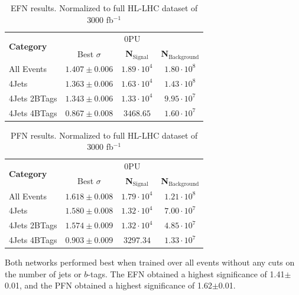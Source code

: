 \begin{table}[ht!]
\centering
    \begin{tabular}{|l|c|c|c|} %
      \hline\hline
      \multirow{2}{*}{\textbf{Category}} & \multicolumn{3}{c|}{0PU}\\
      \cline{2-4}
      & Best $\sigma$ & \textbf{N$_{\mathrm{Signal}}$} & \textbf{N$_{\mathrm{Background}}$} \\
      \hline
      All Events & $1.407 \pm 0.006$ & $1.89\cdot 10^4$ & $1.80\cdot 10^8$ \\
      4Jets & $1.363 \pm 0.006$ & $1.63\cdot 10^4$ & $1.43\cdot 10^8$ \\
      4Jets 2BTags & $1.343 \pm 0.006$ & $1.33\cdot 10^4$ & $9.95\cdot 10^7$ \\
      4Jets 4BTags & $0.867 \pm 0.008$ & $3468.65$ & $1.60\cdot 10^7$ \\
      \hline\hline
    \end{tabular}
    \caption{EFN results. Normalized to full HL-LHC dataset of 3000 fb$^{-1}$}
\label{EFNtab}
\end{table}

\begin{table}[ht!]
\centering
    \begin{tabular}{|l|c|c|c|} %
      \hline\hline
      \multirow{2}{*}{\textbf{Category}} & \multicolumn{3}{c|}{0PU}\\
      \cline{2-4}
      & Best $\sigma$ & \textbf{N$_{\mathrm{Signal}}$} & \textbf{N$_{\mathrm{Background}}$} \\
      \hline
      All Events & $1.618 \pm 0.008$ & $1.79\cdot 10^4$ & $1.21\cdot 10^8$ \\
      4Jets & $1.580 \pm 0.008$ & $1.32\cdot 10^4$ & $7.00\cdot 10^7$ \\
      4Jets 2BTags & $1.574 \pm 0.009$ & $1.32\cdot 10^4$ & $4.85\cdot 10^7$ \\
      4Jets 4BTags & $0.903 \pm 0.009$ & $3297.34$ & $1.33\cdot 10^7$ \\
      \hline\hline
    \end{tabular}
    \caption{PFN results. Normalized to full HL-LHC dataset of 3000 fb$^{-1}$}
\label{PFNtab}
\end{table}

Both networks performed best when trained over all events without any cuts on the number of jets or $b$-tags. The EFN obtained a highest significance of 1.41$\pm$0.01, and the PFN obtained a highest significance of 1.62$\pm$0.01.
